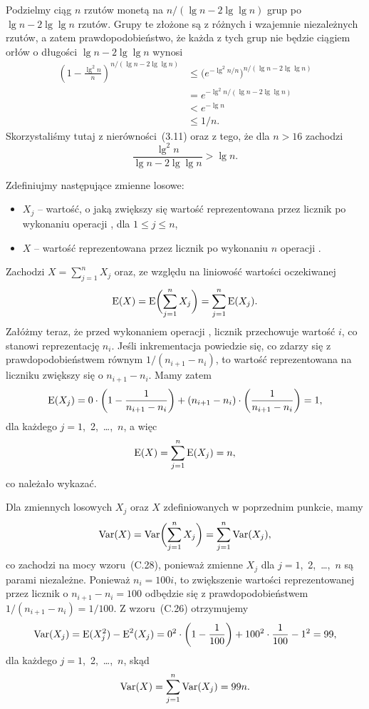 Podzielmy ciąg $n$ rzutów monetą na $n/(\lg n-2\lg\lg n)$ grup po $\lg n-2\lg\lg n$ rzutów. Grupy te złożone są z różnych i wzajemnie niezależnych rzutów, a zatem prawdopodobieństwo, że każda z tych grup nie będzie ciągiem orłów o długości $\lg n-2\lg\lg n$ wynosi
\begin{align*}
	\left(1-\frac{\lg^2n}{n}\right)^{n/(\lg n-2\lg\lg n)} &\le \bigl(e^{-\lg^2n/n}\bigr)^{n/(\lg n-2\lg\lg n)} \\
	&= e^{-\lg^2n/(\lg n-2\lg\lg n)} \\
	&< e^{-\lg n} \\
	&\le 1/n.
\end{align*}
Skorzystaliśmy tutaj z nierówności~(3.11) oraz z tego, że dla $n>16$ zachodzi
\[
	\frac{\lg^2n}{\lg n-2\lg\lg n} > \lg n.
\]

\problems


\subproblem %
Zdefiniujmy następujące zmienne losowe:
\begin{itemize}
	\item $X_j$ -- wartość, o jaką zwiększy się wartość reprezentowana przez licznik po  wykonaniu operacji , dla $1\le j\le n$,
	\item $X$ -- wartość reprezentowana przez licznik po wykonaniu $n$ operacji .
\end{itemize}
Zachodzi $X=\sum_{j=1}^nX_j$ oraz, ze względu na liniowość wartości oczekiwanej
\[
	\operatorname{E}(X) = \operatorname{E}\biggl(\sum_{j=1}^nX_j\biggr) = \sum_{j=1}^n\operatorname{E}(X_j).
\]
Załóżmy teraz, że przed wykonaniem  operacji , licznik przechowuje wartość $i$, co stanowi reprezentację $n_i$. Jeśli inkrementacja powiedzie się, co zdarzy się z prawdopodobieństwem równym $1/(n_{i+1}-n_i)$, to wartość reprezentowana na liczniku zwiększy się o $n_{i+1}-n_i$. Mamy zatem
\[
	\operatorname{E}(X_j) = 0\cdot\left(1-\frac{1}{n_{i+1}-n_i}\right)+(n_{i+1}-n_i)\cdot\left(\frac{1}{n_{i+1}-n_i}\right) = 1,
\]
dla każdego $j=1$,~2,~\dots,~$n$, a więc
\[
	\operatorname{E}(X) = \sum_{j=1}^n\operatorname{E}(X_j) = n,
\]
co należało wykazać.

\subproblem %
Dla zmiennych losowych $X_j$ oraz $X$ zdefiniowanych w poprzednim punkcie, mamy
\[
	\operatorname{Var}(X) = \operatorname{Var}\biggl(\sum_{j=1}^nX_j\biggr) = \sum_{j=1}^n\operatorname{Var}(X_j),
\]
co zachodzi na mocy wzoru~(C.28), ponieważ zmienne $X_j$ dla $j=1$,~2,~\dots,~$n$ są parami niezależne. Ponieważ $n_i=100i$, to zwiększenie wartości reprezentowanej przez licznik o $n_{i+1}-n_i=100$ odbędzie się z prawdopodobieństwem $1/(n_{i+1}-n_i)=1/100$. Z wzoru~(C.26) otrzymujemy
\[
	\operatorname{Var}(X_j) = \operatorname{E}(X_j^2)-\operatorname{E}^2(X_j) = 0^2\cdot\left(1-\frac{1}{100}\right)+100^2\cdot\frac{1}{100}-1^2 = 99,
\]
dla każdego $j=1$,~2,~\dots,~$n$, skąd
\[
	\operatorname{Var}(X) = \sum_{j=1}^n\operatorname{Var}(X_j) = 99n.
\]

